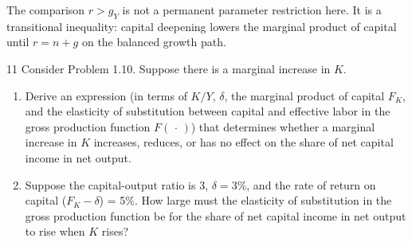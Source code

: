 \begin{note}
    The comparison \(r>g_Y\) is not a permanent parameter restriction here.
    It is a transitional inequality: capital deepening lowers the marginal
    product of capital until \(r=n+g\) on the balanced growth path.
\end{note}

\begin{problem}{11}
Consider Problem 1.10. Suppose there is a marginal increase in \(K\).
\begin{enumerate}[label=(\alph*)]
    \item Derive an expression (in terms of \(K/Y\), \(\delta\), the marginal product of capital
    \(F_K\), and the elasticity of substitution between capital and effective labor in the gross
    production function \(F\left(\,\cdot\,\right)\)) that determines whether a marginal increase
    in \(K\) increases, reduces, or has no effect on the share of net capital income in net output.
    \item Suppose the capital-output ratio is 3, \(\delta=3\%\), and the rate of return on capital
    (\(F_K-\delta\)) = 5\%. How large must the elasticity of substitution in the gross production
    function be for the share of net capital income in net output to rise when \(K\) rises?
\end{enumerate}
\end{problem}

